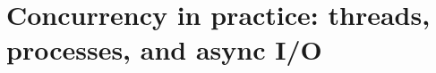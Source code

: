 \chapter{Concurrency in practice: threads, processes, and async I/O}
\label{ch:concurrency-in-practice-threads}

